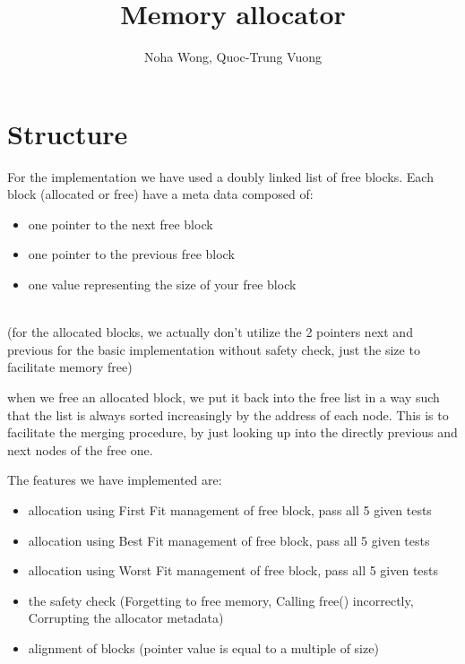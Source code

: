 \documentclass{article}
\title{Memory allocator}
\author{Noha Wong, Quoc-Trung Vuong}
\begin{document}
\maketitle
\newpage

\part{Structure}

For the implementation we have used a doubly linked list of free blocks.
Each block (allocated or free) have a meta data composed of:

\begin{itemize}
\item one pointer to the next free block
\item one pointer to the previous free block
\item one value representing the size of your free block \\ \\
\end{itemize}

(for the allocated blocks, we actually don't utilize the 2 pointers next and previous for the basic implementation without safety check, just the size to facilitate memory free)

when we free an allocated block, we put it back into the free list in a way such that the list is always sorted increasingly by the address of each node. This is to facilitate the merging procedure, by just looking up into the directly previous and next nodes of the free one.

\begin{flushleft}
The features we have implemented are:
\end{flushleft}


\begin{itemize}
\item allocation using First Fit management of free block, pass all 5 given tests
\item allocation using Best Fit management of free block, pass all 5 given tests
\item allocation using Worst Fit management of free block, pass all 5 given tests
\item the safety check (Forgetting to free memory, Calling free() incorrectly, Corrupting the allocator metadata)
\item alignment of blocks (pointer value is equal to a multiple of size)
\end{itemize}
\end{document}
